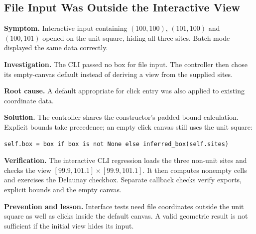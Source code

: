 \clearpage
\subsection{File Input Was Outside the Interactive View}

\textbf{Symptom.} Interactive input containing $(100,100)$, $(101,100)$ and $(100,101)$ opened on the unit square, hiding all three sites. Batch mode displayed the same data correctly.

\textbf{Investigation.} The CLI passed no box for file input. The controller then chose its empty-canvas default instead of deriving a view from the supplied sites.

\textbf{Root cause.} A default appropriate for click entry was also applied to existing coordinate data.

\textbf{Solution.} The controller shares the constructor's padded-bound calculation. Explicit bounds take precedence; an empty click canvas still uses the unit square:

\begin{lstlisting}[caption={Infer the interactive view from supplied sites.},label={lst:bounds-fix}]
self.box = box if box is not None else inferred_box(self.sites)
\end{lstlisting}

\textbf{Verification.} The interactive CLI regression loads the three non-unit sites and checks the view $[99.9,101.1]\times[99.9,101.1]$. It then computes nonempty cells and exercises the Delaunay checkbox. Separate callback checks verify exports, explicit bounds and the empty canvas.

\textbf{Prevention and lesson.} Interface tests need file coordinates outside the unit square as well as clicks inside the default canvas. A valid geometric result is not sufficient if the initial view hides its input.

\lstset{aboveskip=12pt,belowskip=12pt,lineskip=1pt}

